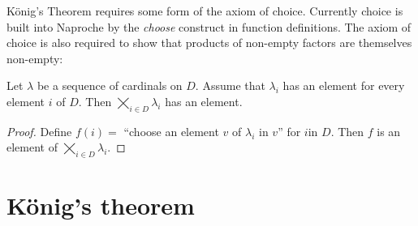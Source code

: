 \documentclass{article}
\newcommand{\ProdSet}[2]{\bigtimes_{i \in #2} #1_{i}}
\begin{document}
König's Theorem requires some form of the axiom of choice.
Currently choice is built into Naproche by the \emph{choose} construct in
function definitions.
The axiom of choice is also required to show that products of non-empty factors
are themselves non-empty:

\begin{forthel}
  \begin{lemma*}[title=Choice]
    Let $\lambda$ be a sequence of cardinals on $D$.
    Assume that $\lambda_{i}$ has an element for every element $i$ of $D$.
    Then $\ProdSet{\lambda}{D}$ has an element.
  \end{lemma*}
  \begin{proof}
    Define $f(i) =$ ``choose an element $v$ of $\lambda_{i}$ in $v$'' for $i$in $D$.
    Then $f$ is an element of $\ProdSet{\lambda}{D}$.
  \end{proof}
\end{forthel}


\section*{König's theorem}
\end{document}
